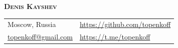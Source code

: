 \documentclass[a4paper]{article}
\begin{document}
\vspace*{-40pt}

\vspace*{-10pt}
\begin{center}
    \textbf{{\huge \scshape {Denis Kayshev}}}\\
    \vspace*{10pt}
    \begin{tabular}{l l}
        Moscow, Russia & \url{https://github.com/topenkoff} \\
        \href{mailto:topenkoff@gmail.com}{topenkoff@gmail.com} & \url{https://t.me/topenkoff} \\
    \end{tabular}
    \vspace*{15pt}
\end{center}

\vspace{1mm}
\end{document}
